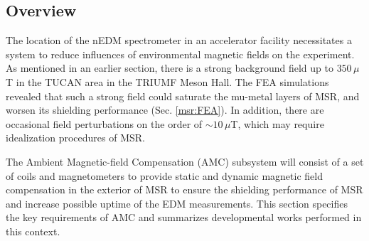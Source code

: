 \subsection{Overview}
The location of the nEDM spectrometer in an accelerator facility necessitates a system to reduce influences of environmental magnetic fields on the experiment. As mentioned in an earlier section, there is a strong background field up to $350\,\mu$T in the TUCAN area in the TRIUMF Meson Hall. The FEA simulations revealed that such a strong field could saturate the mu-metal layers of MSR, and worsen its shielding performance (Sec. \ref{msr:FEA}). In addition, there are occasional field perturbations on the order of $\sim 10\,\mu$T, which may require idealization procedures of MSR. 

The Ambient Magnetic-field Compensation (AMC) subsystem will consist of a set of coils and magnetometers to provide static and dynamic magnetic field compensation in the exterior of MSR to ensure the shielding performance of MSR and increase possible uptime of the EDM measurements. This section specifies the key requirements of  AMC and summarizes developmental works performed in this context.  

